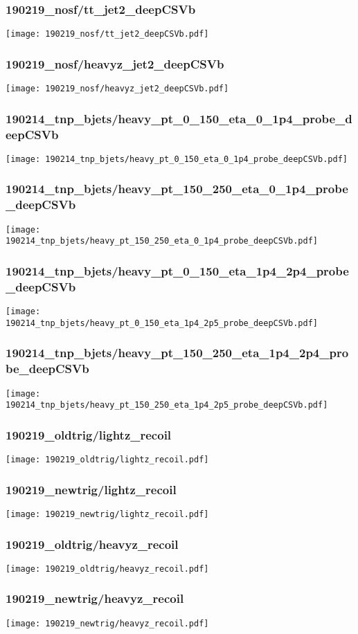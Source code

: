 \begin{frame}
   \frametitle{\small 190219\_nosf/tt\_jet2\_deepCSVb}
   \centering
   \texttt{[image: 190219\_nosf/tt\_jet2\_deepCSVb.pdf]}
\end{frame}

\begin{frame}
   \frametitle{\small 190219\_nosf/heavyz\_jet2\_deepCSVb}
   \centering
   \texttt{[image: 190219\_nosf/heavyz\_jet2\_deepCSVb.pdf]}
\end{frame}

\begin{frame}
   \frametitle{\small 190214\_tnp\_bjets/heavy\_pt\_0\_150\_eta\_0\_1p4\_probe\_deepCSVb}
   \centering
   \texttt{[image: 190214\_tnp\_bjets/heavy\_pt\_0\_150\_eta\_0\_1p4\_probe\_deepCSVb.pdf]}
\end{frame}

\begin{frame}
   \frametitle{\small 190214\_tnp\_bjets/heavy\_pt\_150\_250\_eta\_0\_1p4\_probe\_deepCSVb}
   \centering
   \texttt{[image: 190214\_tnp\_bjets/heavy\_pt\_150\_250\_eta\_0\_1p4\_probe\_deepCSVb.pdf]}
\end{frame}

\begin{frame}
   \frametitle{\small 190214\_tnp\_bjets/heavy\_pt\_0\_150\_eta\_1p4\_2p4\_probe\_deepCSVb}
   \centering
   \texttt{[image: 190214\_tnp\_bjets/heavy\_pt\_0\_150\_eta\_1p4\_2p5\_probe\_deepCSVb.pdf]}
\end{frame}

\begin{frame}
   \frametitle{\small 190214\_tnp\_bjets/heavy\_pt\_150\_250\_eta\_1p4\_2p4\_probe\_deepCSVb}
   \centering
   \texttt{[image: 190214\_tnp\_bjets/heavy\_pt\_150\_250\_eta\_1p4\_2p5\_probe\_deepCSVb.pdf]}
\end{frame}

\begin{frame}
   \frametitle{\small 190219\_oldtrig/lightz\_recoil}
   \centering
   \texttt{[image: 190219\_oldtrig/lightz\_recoil.pdf]}
\end{frame}

\begin{frame}
   \frametitle{\small 190219\_newtrig/lightz\_recoil}
   \centering
   \texttt{[image: 190219\_newtrig/lightz\_recoil.pdf]}
\end{frame}

\begin{frame}
   \frametitle{\small 190219\_oldtrig/heavyz\_recoil}
   \centering
   \texttt{[image: 190219\_oldtrig/heavyz\_recoil.pdf]}
\end{frame}

\begin{frame}
   \frametitle{\small 190219\_newtrig/heavyz\_recoil}
   \centering
   \texttt{[image: 190219\_newtrig/heavyz\_recoil.pdf]}
\end{frame}

